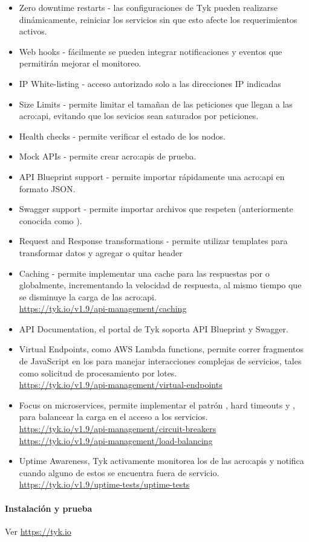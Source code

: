 \begin{itemize}
  \item Zero downtime restarts - las configuraciones de Tyk pueden realizarse dinámicamente, reiniciar los servicios sin que esto afecte los requerimientos activos.
  \item Web hooks - fácilmente se pueden integrar notificaciones y eventos que permitirán mejorar el monitoreo.
  \item IP White-listing - acceso autorizado solo a las direcciones IP indicadas
  \item Size Limits - permite limitar el tamañan de las peticiones que llegan a las \gls{acro:api}, evitando que los sevicios sean saturados por peticiones.
  \item Health checks - permite verificar el estado de los nodos.
  \item Mock APIs - permite crear \glspl{acro:api} de prueba.
  \item API Blueprint support - permite importar rápidamente una \gls{acro:api} en formato JSON.
  \item Swagger support - permite importar archivos que respeten  (anteriormente conocida como ).
  \item Request and Response transformations - permite utilizar templates para transformar datos y agregar o quitar header 
  \item Caching - permite implementar una cache para las respuestas por  o globalmente, incrementando la velocidad de respuesta, al mismo tiempo que se disminuye la carga de las \gls{acro:api}. \\
  \url{https://tyk.io/v1.9/api-management/caching}
  \item API Documentation, el portal de Tyk soporta API Blueprint y Swagger.
  \item Virtual Endpoints, como AWS Lambda functions, permite correr fragmentos de JavaScript en los  para manejar interacciones complejas de servicios, tales como solicitud de procesamiento por lotes. \\
  \url{https://tyk.io/v1.9/api-management/virtual-endpoints}
  \item Focus on microservices, permite implementar el patrón , hard timeouts y , para balancear la carga en el acceso a los servicios. \\
  \url{https://tyk.io/v1.9/api-management/circuit-breakers} \\
  \url{https://tyk.io/v1.9/api-management/load-balancing}
  \item Uptime Awareness, Tyk activamente monitorea los  de las \glspl{acro:api} y notifica cuando alguno de estos se encuentra fuera de servicio. \\
  \url{https://tyk.io/v1.9/uptime-tests/uptime-tests}
\end{itemize}

\paragraph{Instalación y prueba}

Ver \url{https://tyk.io}

